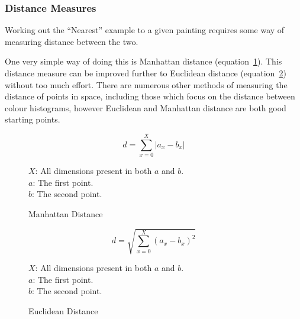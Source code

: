 \documentclass[11pt,fleqn,twoside]{article}
\begin{document}
\clearpage
\subsubsection{Distance Measures}
Working out the ``Nearest'' example to a given painting requires some way of measuring distance
between the two.

One very simple way of doing this is Manhattan distance (equation~\ref{eq:manhattan}). This distance
measure can be improved further to Euclidean distance (equation~\ref{eq:euclidean}) without too much
effort. There are numerous other methods of measuring the distance of points in space, including
those which focus on the distance between colour histograms, however Euclidean and Manhattan 
distance are both good starting points.

\begin{figure}[h]
\[
d = \sum^X_{x=0}{|a_x - b_x|}
\]

\(X\): All dimensions present in both \(a\) and \(b\).\\
\(a\): The first point.\\
\(b\): The second point.

\caption{Manhattan Distance}
\label{eq:manhattan}
\end{figure}

\begin{figure}[h]
\[
d = \sqrt{\sum^X_{x=0}{(a_x - b_x)^2}}
\]

\(X\): All dimensions present in both \(a\) and \(b\).\\
\(a\): The first point.\\
\(b\): The second point.
\caption{Euclidean Distance}
\label{eq:euclidean}
\end{figure}
\end{document}

